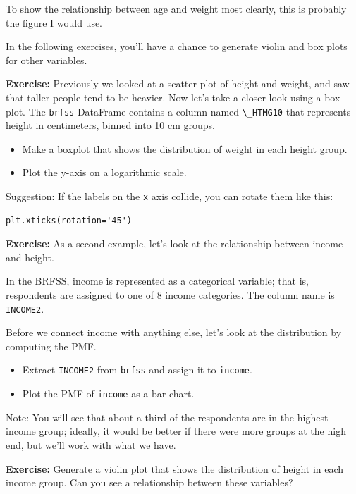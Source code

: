 To show the relationship between age and weight most clearly, this is
probably the figure I would use.

In the following exercises, you'll have a chance to generate violin and
box plots for other variables.

\textbf{Exercise:} Previously we looked at a scatter plot of height and
weight, and saw that taller people tend to be heavier. Now let's take a
closer look using a box plot. The \passthrough{\lstinline!brfss!}
DataFrame contains a column named \passthrough{\lstinline!\_HTMG10!}
that represents height in centimeters, binned into 10 cm groups.

\begin{itemize}
\item
  Make a boxplot that shows the distribution of weight in each height
  group.
\item
  Plot the y-axis on a logarithmic scale.
\end{itemize}

Suggestion: If the labels on the \passthrough{\lstinline!x!} axis
collide, you can rotate them like this:

\begin{lstlisting}
plt.xticks(rotation='45')
\end{lstlisting}

\textbf{Exercise:} As a second example, let's look at the relationship
between income and height.

In the BRFSS, income is represented as a categorical variable; that is,
respondents are assigned to one of 8 income categories. The column name
is \passthrough{\lstinline!INCOME2!}.

Before we connect income with anything else, let's look at the
distribution by computing the PMF.

\begin{itemize}
\item
  Extract \passthrough{\lstinline!INCOME2!} from
  \passthrough{\lstinline!brfss!} and assign it to
  \passthrough{\lstinline!income!}.
\item
  Plot the PMF of \passthrough{\lstinline!income!} as a bar chart.
\end{itemize}

Note: You will see that about a third of the respondents are in the
highest income group; ideally, it would be better if there were more
groups at the high end, but we'll work with what we have.

\textbf{Exercise:} Generate a violin plot that shows the distribution of
height in each income group. Can you see a relationship between these
variables?

